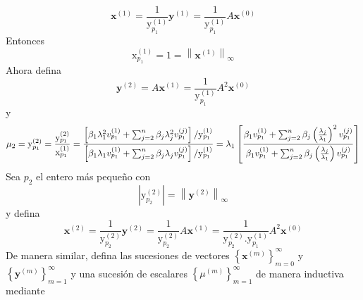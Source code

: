 \documentclass{report}
\numberwithin{subsection}{section} %
\begin{document}
\begin{equation*}
\textbf{x}^{\left( 1 \right)} = \frac{ 1 }{ \text{y}_{p_{1}}^{\left( 1 \right)} } \textbf{y}^{\left( 1 \right)} = \frac{ 1 }{ \text{y}_{p_{1}}^{\left( 1 \right)} } A \textbf{x}^{\left( 0 \right)}
\end{equation*}
Entonces
\begin{equation*}
\text{x}_{p_{1}}^{\left( 1 \right)} = 1 = \left\| \textbf{x}^{\left( 1 \right)} \right\|_{\infty }
\end{equation*}
Ahora defina
\begin{equation*}
\textbf{y}^{\left( 2 \right)} = A\textbf{x}^{\left( 1 \right)} = \frac{1}{\text{y}_{p_{1}}^{\left( 1 \right)}} A^{2}\textbf{x}^{\left( 0 \right)}
\end{equation*}
y
\begin{equation*}
\mu_{2} = \text{y}_{p_{1}}^{\left( 2 \right)} = \frac{\text{y}_{p_{1}}^{\left( 2 \right)}}{\text{x}_{p_{1}}^{\left( 1 \right)}} = \frac{\left[ \beta_{1} \lambda_{1}^{2} v_{p_{1}}^{\left( 1 \right)}+\sum_{j = 2}^{n}\beta_{j} \lambda_{j}^{2} v_{p_{1}}^{\left( j \right)} \right] \huge / \normalsize \text{y}_{p_{1}}^{\left( 1 \right)}}{\left[ \beta_{1} \lambda_{1} v_{p_{1}}^{\left( 1 \right)}+\sum_{j = 2}^{n}\beta_{j} \lambda_{j} v_{p_{1}}^{\left( j \right)} \right] \huge / \normalsize \text{y}_{p_{1}}^{\left( 1 \right)}} = \lambda_{1} \left[ \frac{\beta_{1} v_{p_{1}}^{\left( 1 \right)}+\sum_{j = 2}^{n}\beta_{j} \left( \frac{\lambda_{j}}{\lambda_{1}} \right)^{2} v_{p_{1}}^{\left( j \right)}}{\beta_{1}  v_{p_{1}}^{\left( 1 \right)}+\sum_{j = 2}^{n}\beta_{j} \left( \frac{\lambda_{j}}{\lambda_{1}} \right) v_{p_{1}}^{\left( j \right)}} \right]
\end{equation*}
Sea $p_{2}$ el entero más pequeño con
\begin{equation*}
\left| \text{y}_{p_{2}}^{\left( 2 \right)} \right| = \left\| \textbf{y}^{\left( 2 \right)} \right\|_{\infty }
\end{equation*}
y defina
\begin{equation*}
\textbf{x}^{\left( 2 \right)} = \frac{1}{\text{y}_{p_{2}}^{\left( 2 \right)}} \textbf{y}^{\left( 2 \right)} = \frac{1}{\text{y}_{p_{2}}^{\left( 2 \right)}} A\textbf{x}^{\left( 1 \right)} = \frac{1}{\text{y}_{p_{2}}^{\left( 2 \right)} . \text{y}_{p_{1}}^{\left( 1 \right)}} A^{2}\textbf{x}^{\left( 0 \right)}
\end{equation*}
De manera similar, defina las sucesiones de vectores $\left\{ \textbf{x}^{\left( m \right)} \right\}_{m = 0}^{\infty }$ y $\left\{ \textbf{y}^{\left( m \right)} \right\}_{m = 1}^{\infty }$ y una sucesión de escalares $\left\{ \mu^{\left( m \right)} \right\}_{m = 1}^{\infty }$ de manera inductiva mediante
\end{document}
